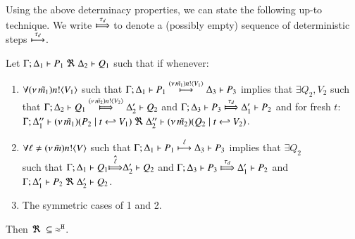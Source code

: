 \documentclass[runningheads]{llncs}
\begin{document}
{%

Using the above determinacy properties, we can state the following up-to technique.
We write $\Hby{\dtau}$ to denote a (possibly empty) sequence of deterministic steps 
$\stackrel{\tau_{d}}{\longmapsto}$.


\begin{lemma}%
	\label{lem:up_to_deterministic_transition}
	Let $\Gamma; \Delta_1 \vdash P_1 \ \Re\  \Delta_2 \vdash Q_1$ such
	that if whenever:
%
	\begin{enumerate}[1.]
		\item	$\forall (\nu\, \tilde{m_1}) n ! \langle V_1 \rangle$ such that
			$
				\Gamma; \Delta_1 \vdash P_1 \stackrel{(\nu\, \tilde{m_1}) n ! \langle V_1 \rangle}{\longmapsto} \Delta_3 \vdash P_3
			$
			implies that $\exists Q_2, V_2$ such that
			$
				\horel{\Gamma}{\Delta_2}{Q_1}{\Hby{\news{\tilde{m_2}} \bactout{n}{V_2}}}{\Delta_2'}{Q_2}
			$
			and
			$
				\horel{\Gamma}{\Delta_3}{P_3}{\Hby{\dtau}}{\Delta_1'}{P_2}
			$
			and for fresh $t$:\\
			$
				\Gamma; \Delta_1'' \vdash (\nu\, \tilde{m_1})(P_2 \;|\; t \hookleftarrow V_1) \ \Re\  \Delta_2'' \vdash{(\nu\, \tilde{m_2})(Q_2 \;|\;t \hookleftarrow V_2)}
			$.
%
		\item	$\forall \ell \not= (\nu\, \tilde{m}) n ! \langle V \rangle$ such that
			$
				\Gamma; \Delta_1 \vdash P_1 \stackrel{\ell}{\longmapsto} \Delta_3 \vdash P_3
			$
			implies that $\exists Q_2$  \\ such that 
			$
				\horel{\Gamma}{\Delta_1}{Q_1}{\hat{\Hby{\ell}}}{\Delta_2'}{Q_2}
			$
			and
			$
				\horel{\Gamma}{\Delta_3}{P_3}{\Hby{\dtau}}{\Delta_1'}{P_2}
			$
			and
			$\Gamma; \Delta_1' \vdash P_2 \ \Re\  \Delta_2' \vdash Q_2$.

		\item	The symmetric cases of 1 and 2.
	\end{enumerate}
	Then $\Re\ \subseteq\ \approx^\mathtt{H}$.
\end{lemma}


}
\end{document}

